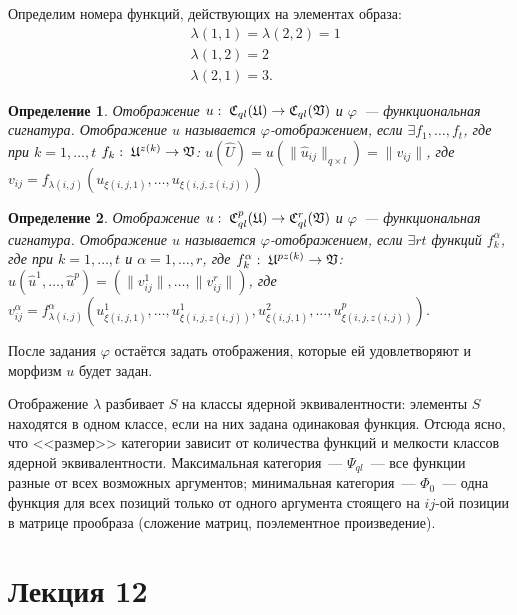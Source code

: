 \documentclass[a4paper, 12pt]{report}
\newtheorem{definition}{Определение}[chapter]
\begin{document}
Определим номера функций, действующих на элементах образа:
\begin{equation*}
\begin{split}
& \lambda(1, 1) = \lambda(2, 2) = 1 \\
& \lambda(1, 2) = 2 \\
& \lambda(2, 1) = 3.
\end{split}
\end{equation*}

\begin{definition}
Отображение $u: \; \mathfrak{C}_{ql}(\mathfrak{U}) \rightarrow \mathfrak{C}_{ql}(\mathfrak{V})$ и $\varphi$~--- функциональная сигнатура. Отображение $u$ называется $\varphi$-отображением, если $\exists f_1, \ldots, f_t$, где при $k = 1, \ldots, t$ $f_k: \; \mathfrak{U}^{z(k)} \rightarrow \mathfrak{V}$: $u(\hat{U}) = u(\| \hat{u}_{ij} \|_{q \times l}) = \| v_{ij} \|$, где $v_{ij} = f_{\lambda(i,j)}(u_{\xi(i,j,1)}, \ldots, u_{\xi(i,j,z(i, j))})$
\end{definition}

\begin{definition}
Отображение $u: \; \mathfrak{C}_{ql}^p(\mathfrak{U}) \rightarrow \mathfrak{C}_{ql}^r(\mathfrak{V})$ и $\varphi$~--- функциональная сигнатура. Отображение $u$ называется $\varphi$-отображением, если $\exists rt$ функций $f^{\alpha}_k$, где при $k = 1, \ldots, t$ и $\alpha = 1, \ldots, r$, где $f^{\alpha}_k: \; \mathfrak{U}^{pz(k)} \rightarrow \mathfrak{V}$: $u(\hat{u}^1, \ldots, \hat{u}^p) = (\| v^1_{ij}\|, \ldots, \| v^r_{ij} \|)$, где $v^{\alpha}_{ij} = f^{\alpha}_{\lambda(i,j)}(u^1_{\xi(i,j,1)}, \ldots, u^1_{\xi(i,j,z(i,j))}, u^2_{\xi(i,j,1)}, \ldots, u^p_{\xi(i,j,z(i, j))})$.
\end{definition}

После задания $\varphi$ остаётся задать отображения, которые ей удовлетворяют и морфизм $u$ будет задан.

Отображение $\lambda$ разбивает $S$ на классы ядерной эквивалентности: элементы $S$ находятся в одном классе, если на них задана одинаковая функция. Отсюда ясно, что <<размер>> категории зависит от количества функций и мелкости классов ядерной эквивалентности. Максимальная категория~--- $\Psi_{ql}$~--- все функции разные от всех возможных аргументов; минимальная категория~--- $\Phi_0$~--- одна функция для всех позиций только от одного аргумента стоящего на $ij$-ой позиции в матрице прообраза (сложение матриц, поэлементное произведение).

\chapter{Лекция 12}
\end{document}
